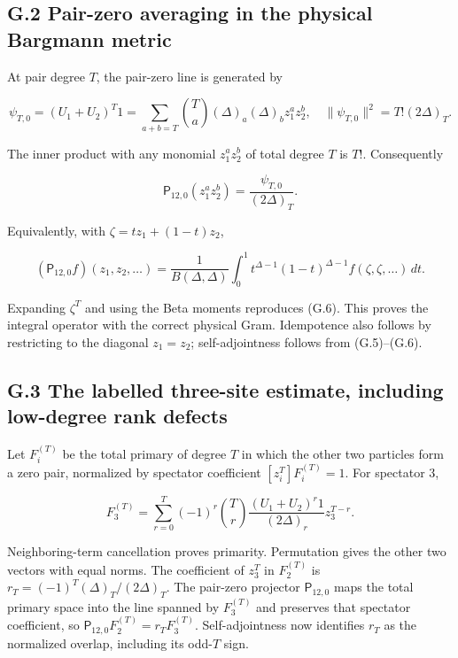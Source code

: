 \documentclass[a4paper,11pt]{article}
\numberwithin{equation}{section}
\begin{document}
\hypertarget{g.2-pair-zero-averaging-in-the-physical-bargmann-metric}{%
\subsection{G.2 Pair-zero averaging in the physical Bargmann metric}\label{g.2-pair-zero-averaging-in-the-physical-bargmann-metric}}

At pair degree \(T\), the pair-zero line is generated by

\[
\psi_{T,0}=(U_1+U_2)^T1
=\sum_{a+b=T}\binom Ta(\Delta)_a(\Delta)_b z_1^az_2^b,
\quad\|\psi_{T,0}\|^2=T!(2\Delta)_T.
\tag{G.5}
\]

The inner product with any monomial \(z_1^az_2^b\) of total degree \(T\) is \(T!\). Consequently

\[
\mathsf P_{12,0}(z_1^az_2^b)=\frac{\psi_{T,0}}{(2\Delta)_T}.
\tag{G.6}
\]

Equivalently, with \(\zeta=tz_1+(1-t)z_2\),

\[
(\mathsf P_{12,0}f)(z_1,z_2,\ldots)
=\frac1{B(\Delta,\Delta)}\int_0^1t^{\Delta-1}(1-t)^{\Delta-1}
f(\zeta,\zeta,\ldots)\,dt.
\tag{G.7}
\]

Expanding \(\zeta^T\) and using the Beta moments reproduces (G.6). This proves the integral operator with the correct physical Gram. Idempotence also follows by restricting to the diagonal \(z_1=z_2\); self-adjointness follows from (G.5)--(G.6).

\hypertarget{g.3-the-labelled-three-site-estimate-including-low-degree-rank-defects}{%
\subsection{G.3 The labelled three-site estimate, including low-degree rank defects}\label{g.3-the-labelled-three-site-estimate-including-low-degree-rank-defects}}

Let \(F_i^{(T)}\) be the total primary of degree \(T\) in which the other two particles form a zero pair, normalized by spectator coefficient \([z_i^T]F_i^{(T)}=1\). For spectator 3,

\[
F_3^{(T)}=\sum_{r=0}^T(-1)^r\binom Tr
\frac{(U_1+U_2)^r1}{(2\Delta)_r}z_3^{T-r}.
\tag{G.8}
\]

Neighboring-term cancellation proves primarity. Permutation gives the other two vectors with equal norms. The coefficient of \(z_3^T\) in \(F_2^{(T)}\) is \(r_T=(-1)^T(\Delta)_T/(2\Delta)_T\). The pair-zero projector \(\mathsf P_{12,0}\) maps the total primary space into the line spanned by \(F_3^{(T)}\) and preserves that spectator coefficient, so \(\mathsf P_{12,0}F_2^{(T)}=r_TF_3^{(T)}\). Self-adjointness now identifies \(r_T\) as the normalized overlap, including its odd-\(T\) sign.
\end{document}
